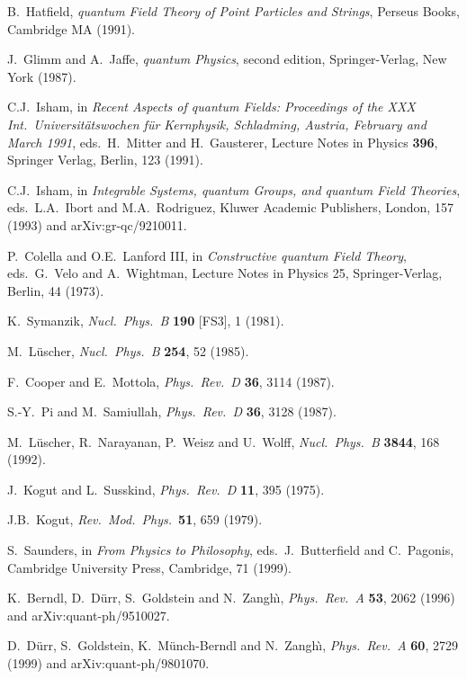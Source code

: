 \documentclass[12pt]{article}
\begin{document}
\begin{thebibliography}{100}
{B.\ Hatfield, {\em quantum Field Theory of Point Particles and Strings},
  Perseus Books, Cambridge MA (1991).}

{J.\ Glimm and A.\ Jaffe, {\em quantum Physics}, second edition,
  Springer-Verlag, New York (1987).}

{C.J.\ Isham, in {\em Recent Aspects of quantum Fields: Proceedings of the XXX
  Int.\ Universit\"atswochen f\"ur Kernphysik, Schladming, Austria, February
  and March 1991}, eds.\ H.\ Mitter and H.\ Gausterer, Lecture Notes in Physics
  {\bf 396}, Springer Verlag, Berlin, 123 (1991).}

{C.J.\ Isham, in {\em Integrable Systems, quantum Groups, and quantum Field
  Theories}, eds.\ L.A.\ Ibort and M.A.\ Rodriguez, Kluwer Academic Publishers,
  London, 157 (1993) and arXiv:gr-qc/9210011.}

{P.\ Colella and O.E.\ Lanford III, in {\em Constructive quantum Field Theory},
  eds.\ G.\ Velo and A.\ Wightman, Lecture Notes in Physics 25,
  Springer-Verlag, Berlin, 44 (1973).}

{K.\ Symanzik, {\em Nucl.\ Phys.\ B} {\bf 190} [FS3], 1 (1981).}

{M.\ L\"uscher, {\em Nucl.\ Phys.\ B} {\bf 254}, 52 (1985).}

{F.\ Cooper and E.\ Mottola, {\em Phys.\ Rev.\ D} {\bf 36}, 3114 (1987).}

{S.-Y.\ Pi and M.\ Samiullah, {\em Phys.\ Rev.\ D} {\bf 36}, 3128 (1987).}

{M.\ L\"uscher, R.\ Narayanan, P.\ Weisz and U.\ Wolff, {\em Nucl.\ Phys.\ B}
  {\bf 3844}, 168 (1992).}

{J.\ Kogut and L.\ Susskind, {\em Phys.\ Rev.\ D} {\bf 11}, 395 (1975).}

{J.B.\ Kogut, {\em Rev.\ Mod.\ Phys.}\ {\bf 51}, 659 (1979).}

{S.\ Saunders, in {\em From Physics to Philosophy}, eds.\ J.\ Butterfield and
  C.\ Pagonis, Cambridge University Press, Cambridge, 71 (1999).}

{K.\ Berndl, D.\ D\"urr, S.\ Goldstein and N.\ Zangh\`\i, {\em Phys.\ Rev.\ A}
  {\bf 53}, 2062 (1996) and arXiv:quant-ph/9510027.}

{D.\ D\"urr, S.\ Goldstein, K.\ M\"unch-Berndl and N.\ Zangh\`\i, {\em Phys.\
  Rev.\ A} {\bf 60}, 2729 (1999) and arXiv:quant-ph/9801070.}


\end{thebibliography}
\end{document}
